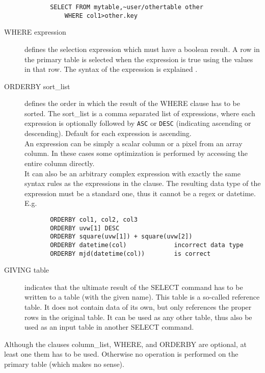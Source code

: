 \begin{description}
\begin{verbatim}
       SELECT FROM mytable,~user/othertable other
           WHERE col1>other.key
       \end{verbatim}
  \item[WHERE expression]
       defines the selection expression which must have a boolean
       result. A row in the primary table
       is selected when the expression is true using the values in that row.
       The syntax of the expression is explained
       .
  \item[ORDERBY sort\_list]
       defines the order in which the result of the WHERE clause
       has to be sorted. The sort\_list is a comma separated list of
       expressions, where each expression is
       optionally followed by \texttt{ASC} or \texttt{DESC}
       (indicating ascending or descending). Default for each expression is
       ascending.
       \\An expression can be simply a scalar column or a pixel from
       an array column. In these cases some optimization is performed
       by accessing the entire column directly.
       \\It can also be an arbitrary complex expression
       with exactly the same syntax rules as the expressions in the
        clause.
       The resulting data type of the expression must
       be a standard one, thus it cannot be a regex or datetime.
       E.g.
       \begin{verbatim}
       ORDERBY col1, col2, col3
       ORDERBY uvw[1] DESC
       ORDERBY square(uvw[1]) + square(uvw[2])
       ORDERBY datetime(col)             incorrect data type
       ORDERBY mjd(datetime(col))        is correct
       \end{verbatim}
  \item[GIVING table]
       indicates that the ultimate result of the SELECT command has to be
       written to a table (with the given name). This table is a
       so-called reference table.
       It does not contain data of its own, but only references the
       proper rows in the original table. It can be used
       as any other table, thus also be used as an input table in
       another SELECT command.
\end{description}
Although the clauses column\_list, WHERE, and ORDERBY are optional,
at least one them has to be used. Otherwise no operation is performed on the
primary table (which makes no sense).


\label{TAQL:EXPRESSIONS}
